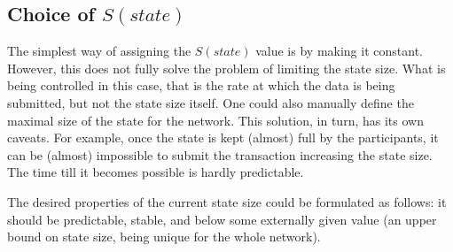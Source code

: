 \documentclass[]{llncs}   %
\newcommand{\authnote}[2]{\marginpar{\parbox{\marginparwidth}{\tiny %
  \textsf{#1 {\textcolor{blue}{notes: #2}}}}}%
  \textcolor{blue}{\textbf{\dag}}}
\newcommand{\authnote}[2]{
  \textsf{#1\textcolor{blue}{ #2}}}
\newcommand{\authnote}[2]{}
\newcommand{\dnote}[1]{{\authnote{\textcolor{red}{Dima notes:}}{#1}}}
\begin{document}
\subsection{Choice of $S(state)$}

The simplest way of assigning the $S(state)$ value is by making it constant.
However, %
this does not fully solve the problem of limiting the state size. What is being controlled in this case,
that is the rate at which the data is being submitted, but not the state size
itself. One could also manually define the maximal size of the state for the
network. This solution, in turn, has its own caveats. For example, once the
state is kept (almost) full by the participants, it can be (almost) impossible
to submit the transaction increasing the state size.  The time till it becomes
possible is hardly predictable. 

The desired properties of the current state size could be formulated as follows:
it should be predictable, stable, and below some externally given value (an upper
bound on state size, being unique for the whole network). 
\end{document}
